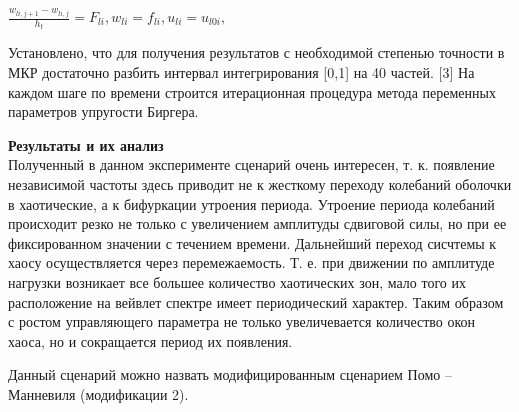 \documentclass[12pt,letterpaper]{extreport}
\begin{document}
$\frac{w_{li,j+1} -w_{li,j}}{h_t}=F_{li}, w_{li} = 
f_{li}, u_{li} = u_{l0i}, $
     
\par Установлено, что для получения результатов с 
необходимой степенью точности в МКР достаточно разбить 
интервал интегрирования [0,1] на 40 частей. [3] На 
каждом шаге по времени строится итерационная процедура 
метода переменных параметров упругости Биргера. 

\par \textbf{Результаты и их анализ}\\
Полученный в данном эксперименте сценарий очень 
интересен, т. к. появление независимой частоты здесь 
приводит не к жесткому переходу колебаний оболочки в 
хаотические, а к бифуркации утроения периода. Утроение 
периода колебаний происходит резко не только с 
увеличением амплитуды сдвиговой силы, но при ее 
фиксированном значении с течением времени. Дальнейший 
переход сисчтемы к хаосу осуществляется через 
перемежаемость. Т. е. при движении по амплитуде нагрузки 
возникает все большее количество хаотических зон, мало 
того их расположение на вейвлет спектре имеет 
периодический  характер. Таким образом с ростом 
управляющего параметра не только увеличевается 
количество окон хаоса, но и сокращается период их 
появления. 
\par Данный сценарий можно назвать модифицированным 
сценарием Помо – Манневиля (модификации 2).
\end{document}
